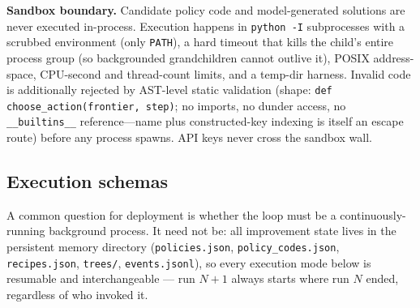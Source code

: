 \documentclass[11pt,a4paper]{article}
\newcommand{\hdr}[1]{\textbf{#1}}
\begin{document}
\hdr{Sandbox boundary.} Candidate policy code and model-generated solutions
are never executed in-process. Execution happens in
\texttt{python~-I} subprocesses with a scrubbed environment (only
\texttt{PATH}), a hard timeout that kills the child's entire process group
(so backgrounded grandchildren cannot outlive it), POSIX address-space,
CPU-second and thread-count limits, and a temp-dir harness.
Invalid code is additionally rejected by AST-level static validation (shape:
\texttt{def choose\_action(frontier, step)}; no imports, no dunder access, no
\texttt{\_\_builtins\_\_} reference---name plus constructed-key indexing is
itself an escape route) before any process spawns. API keys never cross the
sandbox wall.

\subsection{Execution schemas}
\label{sec:execution}

A common question for deployment is whether the loop must be a
continuously-running background process. It need not be: all improvement
state lives in the persistent memory directory
(\texttt{policies.json}, \texttt{policy\_codes.json}, \texttt{recipes.json},
\texttt{trees/}, \texttt{events.jsonl}), so every
execution mode below is resumable and interchangeable --- run $N{+}1$ always
starts where run $N$ ended, regardless of who invoked it.
\end{document}
